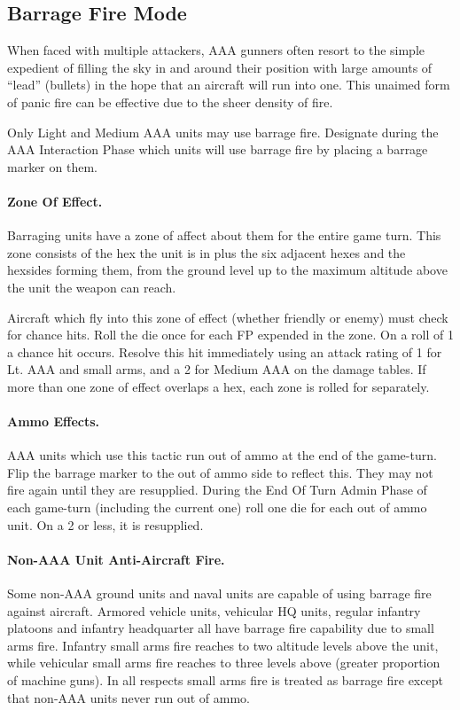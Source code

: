 \subsection{Barrage Fire Mode}



When faced with multiple attackers, AAA gunners often resort to the simple expedient of filling the sky in and around their position with large amounts of “lead” (bullets) in the hope that an aircraft will run into one. This unaimed form of panic fire can be effective due to the sheer density of fire.

Only Light and Medium AAA units may use barrage fire. Designate during the AAA Interaction Phase which units will use barrage fire by placing a barrage marker on them.

\paragraph{Zone Of Effect.} Barraging units have a zone of affect about them for the entire game turn. This zone consists of the hex the unit is in plus the six adjacent hexes and the hexsides forming them, from the ground level up to the maximum altitude above the unit the weapon can reach.

Aircraft which fly into this zone of effect (whether friendly or enemy) must check for chance hits. Roll the die once for each FP expended in the zone. On a roll of 1 a chance hit occurs. Resolve this hit immediately using an attack rating of 1 for Lt. AAA and small arms, and a 2 for Medium AAA on the damage tables. If more than one zone of effect overlaps a hex, each zone is rolled for separately.

\paragraph{Ammo Effects.} AAA units which use this tactic run out of ammo at the end of the game-turn. Flip the barrage marker to the out of ammo side to reflect this. They may not fire again until they are resupplied. During the End Of Turn Admin Phase of each game-turn (including the current one) roll one die for each out of ammo unit. On a 2 or less, it is resupplied.

\paragraph{Non-AAA Unit Anti-Aircraft Fire.} Some non-AAA ground units and naval units are capable of using barrage fire against aircraft. Armored vehicle units, vehicular HQ units, regular infantry platoons and infantry headquarter all have barrage fire capability due to small arms fire. Infantry small arms fire reaches to two altitude levels above the unit, while vehicular small arms fire reaches to three levels above (greater proportion of machine guns). In all respects small arms fire is treated as barrage fire except that non-AAA units never run out of ammo.

